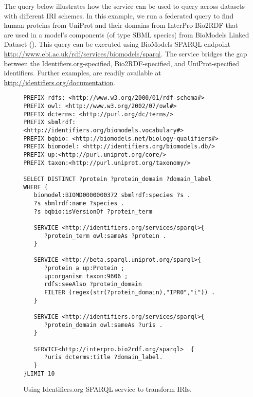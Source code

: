 \documentclass{bioinfo}
\begin{document}
The query below illustrates how the service can be used to query across datasets with different IRI schemes. In this example, we run a federated query to find human proteins from UniProt and their domains from InterPro Bio2RDF that are used in a model's components (of type SBML species) from BioModels Linked Dataset (\cite{Wimalaratne2014}). This query can be executed using BioModels SPARQL endpoint \href{http://www.ebi.ac.uk/rdf/services/biomodels/sparql}{http://www.ebi.ac.uk/rdf/services/biomodels/sparql}. The service bridges the gap between the Identifiers.org-specified, Bio2RDF-specified, and UniProt-specified identifiers. Further examples, are readily available at \href{http://identifiers.org/documentation}{http://identifiers.org/documentation}.

\begin{figure}[h]
{\scriptsize
\begin{verbatim}
PREFIX rdfs: <http://www.w3.org/2000/01/rdf-schema#>
PREFIX owl: <http://www.w3.org/2002/07/owl#>
PREFIX dcterms: <http://purl.org/dc/terms/>
PREFIX sbmlrdf: <http://identifiers.org/biomodels.vocabulary#>
PREFIX bqbio: <http://biomodels.net/biology-qualifiers#>
PREFIX biomodel: <http://identifiers.org/biomodels.db/>
PREFIX up:<http://purl.uniprot.org/core/> 
PREFIX taxon:<http://purl.uniprot.org/taxonomy/> 

SELECT DISTINCT ?protein ?protein_domain ?domain_label WHERE {
   biomodel:BIOMD0000000372 sbmlrdf:species ?s . 
   ?s sbmlrdf:name ?species .
   ?s bqbio:isVersionOf ?protein_term 
   
   SERVICE <http://identifiers.org/services/sparql>{
      ?protein_term owl:sameAs ?protein .
   }

   SERVICE <http://beta.sparql.uniprot.org/sparql>{
      ?protein a up:Protein ; 
      up:organism taxon:9606 ;
      rdfs:seeAlso ?protein_domain 
      FILTER (regex(str(?protein_domain),"IPR0","i")) .
   }

   SERVICE <http://identifiers.org/services/sparql>{
      ?protein_domain owl:sameAs ?uris .
   }

   SERVICE<http://interpro.bio2rdf.org/sparql>  {
      ?uris dcterms:title ?domain_label.
   }      
}LIMIT 10
\end{verbatim}
}
\caption{Using Identifiers.org SPARQL service to transform IRIs.}
\label{example1}
\end{figure}
   
\end{document}
